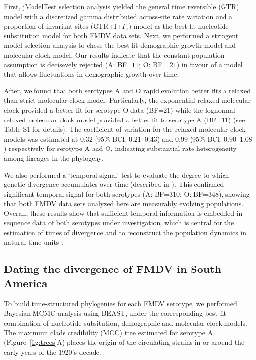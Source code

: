 \documentclass[10pt]{article}
\begin{document}
First, jModelTest selection analysis yielded the general time reversible (GTR) model with a discretized gamma distributed across-site rate variation and a proportion of invariant sites (GTR+I+$\Gamma_{4}$) model as the best fit nucleotide substitution model for both FMDV data sets.
Next, we performed a stringent model selection analysis to chose the best-fit demographic growth model and molecular clock model.
Our results indicate that the constant population assumption is decisevely rejected (A: BF=$11$; O: BF= $21$) in favour of a model that allows fluctuations in demographic growth over time. 

After, we found that both serotypes A and O rapid evolution better fits a relaxed than strict molecular clock model.
Particularly, the exponential relaxed molecular clock provided a better fit for serotype O data (BF=$21$) while the lognormal relaxed molecular clock model provided a better fit to serotype A (BF=$11$) (see Table S1 for details).
The coefficient of variation for the relaxed molecular clock models was estimated at $0.32$ (95\% BCI: $ 0.21$--$0.43$) and $0.99$ (95\% BCI: $0.90$--$1.08$) respectively for serotype A and O, indicating substantial rate heterogeneity among lineages in the phylogeny. 

We also performed a `temporal signal' test to evaluate the degree to which genetic divergence accumulates over time (described in \cite{Faria2012}).
This confirmed significant temporal signal for both serotypes (A: BF=$310$; O: BF=$348$), showing that both FMDV data sets analyzed here are measurably evolving populations.
Overall, these results show that sufficient temporal information is embedded in sequence data of both serotypes under investigation, which is central for the estimation of times of divergence and to reconstruct the population dynamics in natural time units \cite{MEP}.

\subsection*{Dating the divergence of FMDV in South America}

To build time-structured phylogenies for each FMDV serotype, we performed Bayesian MCMC analysis using BEAST, under the corresponding best-fit combination of nucleotide subsitution, demographic and molecular clock models.
The maximum clade credibility (MCC) tree estimated for serotype A (Figure~\ref{fig:trees}A) places the origin of the circulating strains in or around the early years of the 1920's decade.
\end{document}
